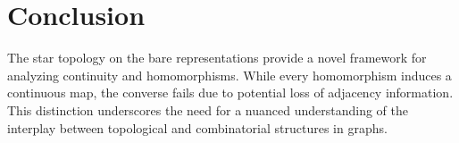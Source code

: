 \documentclass{amsart}
\theoremstyle{definition}
\theoremstyle{remark}
\numberwithin{equation}{section}
\begin{document}
	
	\section{Conclusion}
	\label{Conclusion:sec}
	
	The star topology on the bare representations provide a novel framework for
	analyzing continuity and homomorphisms. While every homomorphism induces a
	continuous map, the converse fails due to potential loss of adjacency
	information. This distinction underscores the need for a nuanced understanding of
	the interplay between topological and combinatorial structures in graphs.
	
	
	
	
\end{document}
